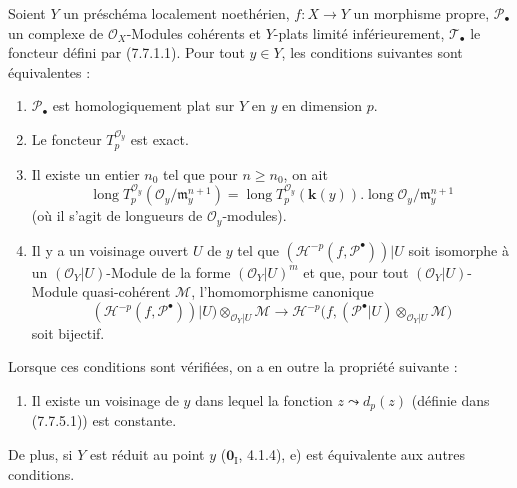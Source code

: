 \begin{proposition}[7.8.4]
Soient $Y$ un préschéma localement noethérien, $f:X\to Y$ un morphisme propre,
$\mathscr P_\bullet$ un complexe de $\mathscr O_X$-Modules cohérents et $Y$-plats
limité inférieurement, $\mathscr T_\bullet$ le foncteur défini par \textup{(7.7.1.1)}.
Pour tout $y\in Y$, les conditions suivantes sont équivalentes :
\begin{enumerate}
  \item[\textup{a)}] $\mathscr P_\bullet$ est homologiquement plat sur $Y$ en $y$ en
    dimension $p$.
  \item[\textup{b)}] Le foncteur $T_p^{\mathscr O_y}$ est exact.
  \item[\textup{c)}] Il existe un entier $n_0$ tel que pour $n\geq n_0$, on ait
    \[
      \operatorname{long}T_p^{\mathscr O_y}
        (\mathscr O_y/\mathfrak m_y^{n+1})
      =
      \operatorname{long}T_p^{\mathscr O_y}(\boldsymbol{k}(y))
      .
      \operatorname{long}\mathscr O_y/\mathfrak m_y^{n+1}
      \tag{7.8.4.1}\label{III.7.8.4.1.fr}
    \]
    (où il s'agit de longueurs de $\mathscr O_y$-modules).
  \item[\textup{d)}] Il y a un voisinage ouvert $U$ de $y$ tel que
    $(\mathcal H^{-p}(f,\mathscr P^\bullet))|U$ soit isomorphe à un
    $(\mathscr O_Y|U)$-Module de la forme $(\mathscr O_Y|U)^m$ et que, pour tout
    $(\mathscr O_Y|U)$-Module quasi-cohérent $\mathscr M$, l'homomorphisme
    canonique
    \[
      (\mathcal H^{-p}(f,\mathscr P^\bullet))|U)
      \otimes_{\mathscr O_Y|U}\mathscr M
      \longrightarrow
      \mathcal H^{-p}
      \bigl(
        f,(\mathscr P^\bullet|U)
          \otimes_{\mathscr O_Y|U}\mathscr M
      \bigr)
      \tag{7.8.4.2}\label{III.7.8.4.2.fr}
    \]
    soit bijectif.
\end{enumerate}

Lorsque ces conditions sont vérifiées, on a en outre la propriété suivante :
\begin{enumerate}
  \item[\textup{e)}] Il existe un voisinage de $y$ dans lequel la fonction
    $z\leadsto d_p(z)$ \textup{(définie dans (7.7.5.1))} est constante.
\end{enumerate}

De plus, si $Y$ est \textup{réduit} au point $y$ \textup{($\mathbf{0}_{\mathrm I}$, 4.1.4)}, e) est
équivalente aux autres conditions.
\end{proposition}

